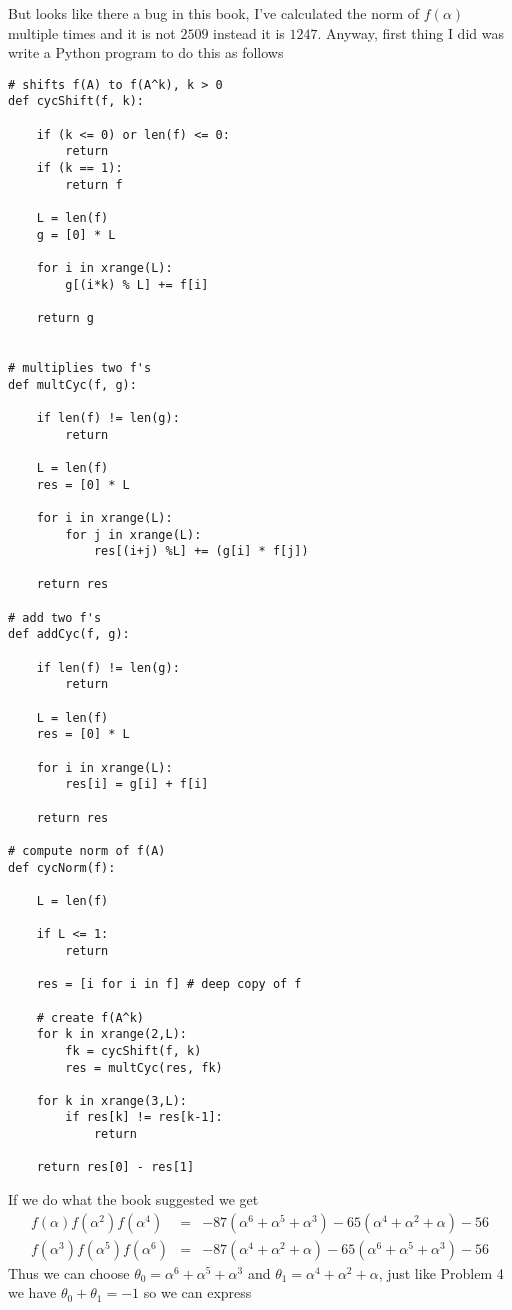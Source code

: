 \documentclass[aps,preprint,preprintnumbers,nofootinbib,showpacs,prd]{revtex4-1}
\newcommand{\nbea}{\begin{eqnarray*}}
\newcommand{\neea}{\end{eqnarray*}}
\begin{document}
But looks like there a bug in this book, I've calculated the norm of $f(\alpha)$ multiple times and it is not $2509$ instead it is $1247$. Anyway, first thing I did was write a Python program to do this as follows
%
\begin{Verbatim}[baselinestretch=0.75]
# shifts f(A) to f(A^k), k > 0
def cycShift(f, k):

    if (k <= 0) or len(f) <= 0:
        return
    if (k == 1):
        return f

    L = len(f)
    g = [0] * L

    for i in xrange(L):
        g[(i*k) % L] += f[i]

    return g
    

# multiplies two f's
def multCyc(f, g):

    if len(f) != len(g):
        return

    L = len(f)
    res = [0] * L

    for i in xrange(L):
        for j in xrange(L):
            res[(i+j) %L] += (g[i] * f[j])

    return res

# add two f's
def addCyc(f, g):
    
    if len(f) != len(g):
        return

    L = len(f)
    res = [0] * L

    for i in xrange(L):
        res[i] = g[i] + f[i]

    return res

# compute norm of f(A)
def cycNorm(f):

    L = len(f)

    if L <= 1:
        return
    
    res = [i for i in f] # deep copy of f

    # create f(A^k)
    for k in xrange(2,L):
        fk = cycShift(f, k)
        res = multCyc(res, fk)

    for k in xrange(3,L):
        if res[k] != res[k-1]:
            return

    return res[0] - res[1]
\end{Verbatim}
%
If we do what the book suggested we get
%
\nbea
f(\alpha)f(\alpha^2)f(\alpha^4) & = & -87(\alpha^6 + \alpha^5 + \alpha^3) - 65(\alpha^4 + \alpha^2 + \alpha) - 56 \\
f(\alpha^3)f(\alpha^5)f(\alpha^6) & = & -87(\alpha^4 + \alpha^2 + \alpha) - 65(\alpha^6 + \alpha^5 + \alpha^3) - 56
\neea
%
Thus we can choose $\theta_0 = \alpha^6 + \alpha^5 + \alpha^3$ and $\theta_1 = \alpha^4 + \alpha^2 + \alpha$, just like Problem 4 we have $\theta_0 + \theta_1 = -1$ so we can express 
\end{document}
